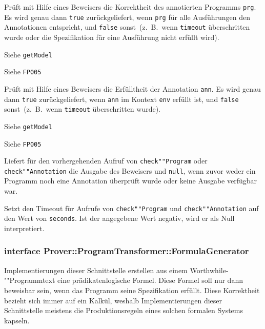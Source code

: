 \begin{description}%


    Prüft mit Hilfe eines Beweisers die Korrektheit des annotierten
    Programms \texttt{prg}. Es wird genau dann \texttt{true}
    zurückgeliefert, wenn \texttt{prg} für alle Ausführungen den
    Annotationen entspricht, und \texttt{false} sonst~(z.~B.\, wenn
    \texttt{timeout} überschritten wurde oder die Spezifikation für
    eine Ausführung nicht erfüllt wird).%

    Siehe \texttt{getModel}%

    Siehe \texttt{FP005}%


    Prüft mit Hilfe eines Beweisers die Erfülltheit der Annotation
    \texttt{ann}. Es wird genau dann \texttt{true} zurückgeliefert,
    wenn \texttt{ann} im Kontext \texttt{env} erfüllt ist, und
    \texttt{false} sonst~(z.~B.\, wenn \texttt{timeout} überschritten
    wurde).%

    Siehe \texttt{getModel}%

    Siehe \texttt{FP005}%


    Liefert für den vorhergehenden Aufruf von \texttt{check""Program}
    oder \texttt{check""Annotation} die Ausgabe des Beweisers und
    \texttt{null}, wenn zuvor weder ein Programm noch eine Annotation
    überprüft wurde oder keine Ausgabe verfügbar war.%


    Setzt den Timeout für Aufrufe von \texttt{check""Program} und
    \texttt{check""Annotation} auf den Wert von \texttt{seconds}. Ist
    der angegebene Wert negativ, wird er als Null interpretiert.%

\end{description}%

\subsubsection{interface Prover::ProgramTransformer::FormulaGenerator}%

Implementierungen dieser Schnittstelle erstellen aus einem
Worthwhile-""Programmtext eine prädikatenlogische Formel. Diese Formel
soll nur dann beweisbar sein, wenn das Programm seine Spezifikation
erfüllt. Diese Korrektheit bezieht sich immer auf ein Kalkül, weshalb
Implementierungen dieser Schnittstelle meistens die Produktionsregeln
eines solchen formalen Systems kapseln.%

